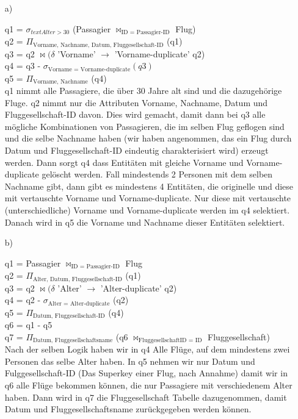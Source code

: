 \begin{itemize}

\item[a)]

q1 = $\sigma_{text{Alter > 30}}$ (Passagier $\bowtie_{\text{ID = Passagier-ID}}$ Flug) \\
q2 = $\Pi_{\text{Vorname, Nachname, Datum, Fluggesellschaft-ID}}$ (q1) \\
q3 = q2 $\bowtie (\delta$ 'Vorname' $\rightarrow$ 'Vorname-duplicate' q2) \\
q4 = q3 - $\sigma_{\text{Vorname = Vorname-duplicate}} (q3)$ \\
q5 = $\Pi_{\text{Vorname, Nachname}}$ (q4) \\

q1 nimmt alle Passagiere, die über 30 Jahre alt sind und die dazugehörige Fluge.
q2 nimmt nur die Attributen Vorname, Nachname, Datum und Fluggesellschaft-ID davon. Dies wird gemacht, damit dann bei q3 alle mögliche Kombinationen von Passagieren, die im selben Flug geflogen sind und die selbe Nachname haben (wir haben angenommen, das ein Flug durch Datum und Fluggesellschaft-ID eindeutig charakterisiert wird) erzeugt werden. Dann sorgt q4 dass Entitäten mit gleiche Vorname und Vorname-duplicate gelöscht werden. Fall mindestends 2 Personen mit dem selben Nachname gibt, dann gibt es mindestens 4 Entitäten, die originelle und diese mit vertauschte Vorname und Vorname-duplicate. Nur diese mit vertauschte (unterschiedliche) Vorname und Vorname-duplicate werden im q4 selektiert. Danach wird in q5 die Vorname und Nachname dieser Entitäten selektiert.

\item[b)]

q1 = Passagier $\bowtie_{\text{ID = Passagier-ID}}$ Flug \\
q2 = $\Pi_{\text{Alter, Datum, Fluggesellschaft-ID}}$ (q1) \\
q3 = q2 $\bowtie (\delta$ 'Alter' $\rightarrow$ 'Alter-duplicate' q2) \\
q4 = q2 - $\sigma_{\text{Alter = Alter-duplicate}}$ (q2) \\
q5 = $\Pi_{\text{Datum, Fluggesellschaft-ID}}$ (q4) \\
q6 = q1 - q5 \\
q7 = $\Pi_{\text{Datum, Fluggesellschaftsname}}$ (q6 $\bowtie_{\text{FluggesellschaftID = ID}}$ Fluggesellschaft) \\

Nach der selben Logik haben wir in q4 Alle Flüge, auf dem mindestens zwei Personen das selbe Alter haben. In q5 nehmen wir nur Datum und Fulggesellschaft-ID (Das Superkey einer Flug, nach Annahme) damit wir in q6 alle Flüge bekommen können, die nur Passagiere mit verschiedenem Alter haben. Dann wird in q7 die Fluggesellschaft Tabelle dazugenommen, damit Datum und Fluggesellschaftsname zurückgegeben werden können. \\ \\


\end{itemize}
